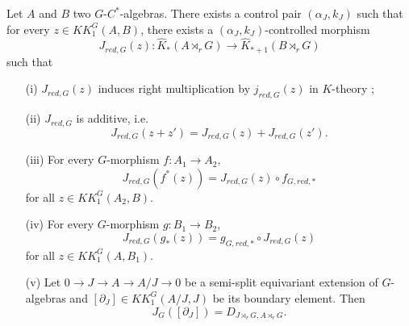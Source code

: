 \begin{prop}\label{Kasparov1}
Let $A$ and $B$ two $G$-$C^*$-algebras. There exists a control pair $(\alpha_J,k_J)$ such that for every $z\in KK^G_1(A,B)$, there exists a $(\alpha_J,k_J)$-controlled morphism
\[J_{red,G}(z) : \hat K_*(A\rtimes_r G)\rightarrow \hat K_{*+1}(B\rtimes_r G)\]
such that
\begin{enumerate}
\item[(i)] $J_{red,G}(z)$ induces right multiplication by $j_{red,G}(z)$ in $K$-theory ;
\item[(ii)] $J_{red,G}$ is additive, i.e.
\[J_{red,G}(z+z')=J_{red,G}(z)+J_{red,G}(z').\]
\item[(iii)] For every $G$-morphism $f : A_1\rightarrow A_2$,
\[J_{red,G}(f^*(z))=J_{red,G}(z)\circ f_{G,red,*}\] for all $z\in KK_1^G(A_2,B)$.
\item[(iv)] For every $G$-morphism $g : B_1\rightarrow B_2$,
\[J_{red,G}(g_*(z))= g_{G,red,*}\circ J_{red,G}(z)\] for all $z\in KK_1^G(A,B_1)$.
\item[(v)] Let $0\rightarrow J\rightarrow A\rightarrow A/J\rightarrow 0$ be a semi-split equivariant extension of $G$-algebras and $[\partial_J]\in KK_1^G(A/J,J)$ be its boundary element. Then 
\[J_G([\partial_J])=D_{J\rtimes_r G,A\rtimes_rG}.\] 
\end{enumerate}
\end{prop}

